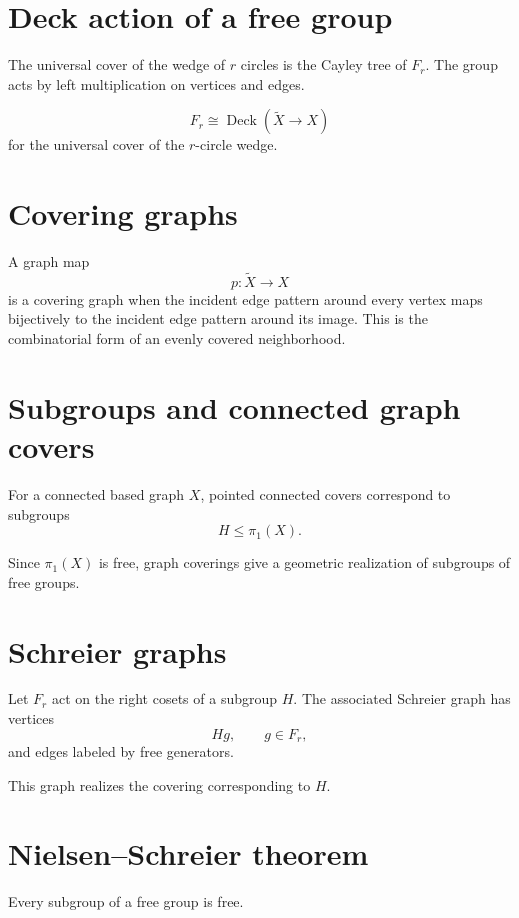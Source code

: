 \section{Deck action of a free group}

The universal cover of the wedge of \(r\) circles is the Cayley tree of
\(F_r\).  The group acts by left multiplication on vertices and edges.

\begin{theorem}
\label{thm:viii14-deck-free}
\[
F_r
\cong
\operatorname{Deck}(\widetilde X\to X)
\]
for the universal cover of the \(r\)-circle wedge.
\end{theorem}

\section{Covering graphs}

A graph map
\[
p:\widetilde X\to X
\]
is a covering graph when the incident edge pattern around every vertex maps
bijectively to the incident edge pattern around its image.  This is the
combinatorial form of an evenly covered neighborhood.

\section{Subgroups and connected graph covers}

For a connected based graph \(X\), pointed connected covers correspond to
subgroups
\[
H\le\pi_1(X).
\]

Since \(\pi_1(X)\) is free, graph coverings give a geometric realization of
subgroups of free groups.

\section{Schreier graphs}

Let \(F_r\) act on the right cosets of a subgroup \(H\).  The associated
Schreier graph has vertices
\[
Hg,\qquad g\in F_r,
\]
and edges labeled by free generators.

This graph realizes the covering corresponding to \(H\).

\section{Nielsen--Schreier theorem}

\begin{theorem}
\label{thm:viii14-nielsen-schreier}
Every subgroup of a free group is free.
\end{theorem}

